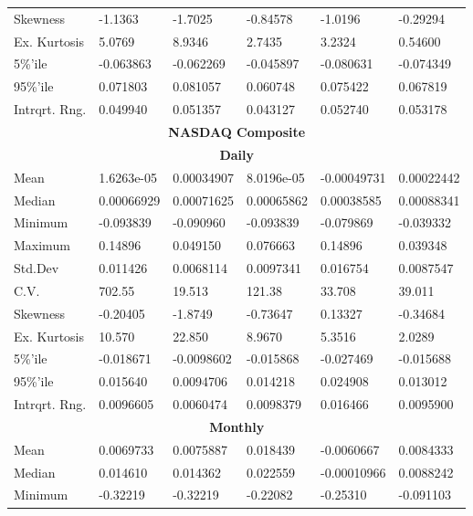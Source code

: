 \documentclass[11pt, english]{article}
\begin{document}
\begin{center}
\begin{longtable}{p{2cm}p{2cm}p{2cm}p{2cm}p{2cm}p{2cm} }
		Skewness & -1.1363 & -1.7025 & -0.84578 & -1.0196 & -0.29294\\
		Ex. Kurtosis & 5.0769 & 8.9346 & 2.7435 & 3.2324 & 0.54600\\
		5\%’ile & -0.063863 & -0.062269 & -0.045897 & -0.080631 & -0.074349\\
		95\%’ile & 0.071803 & 0.081057 & 0.060748 & 0.075422 & 0.067819\\
		Intrqrt. Rng. & 0.049940 & 0.051357 & 0.043127 & 0.052740 & 0.053178\\
		\hline
		\hline
		\multicolumn{6}{c}{\textbf{NASDAQ Composite}}\\
		\hline
		\hline
                \multicolumn{6}{c}{\textbf{Daily}}\\
                \hline
		Mean & 1.6263e-05 & 0.00034907 & 8.0196e-05 & -0.00049731 & 0.00022442\\ 
                Median & 0.00066929 & 0.00071625 & 0.00065862 & 0.00038585 & 0.00088341\\
                Minimum & -0.093839 & -0.090960 & -0.093839 & -0.079869 & -0.039332\\ 
                Maximum & 0.14896 & 0.049150 & 0.076663 & 0.14896 & 0.039348\\
                Std.Dev & 0.011426 & 0.0068114 & 0.0097341 & 0.016754 & 0.0087547\\
                C.V. & 702.55 & 19.513 & 121.38 & 33.708 & 39.011\\
                Skewness & -0.20405 & -1.8749 & -0.73647 & 0.13327 & -0.34684\\
                Ex. Kurtosis & 10.570 & 22.850 & 8.9670 & 5.3516 & 2.0289\\
                5\%’ile & -0.018671 & -0.0098602 & -0.015868 & -0.027469 & -0.015688\\
                95\%’ile & 0.015640 & 0.0094706 & 0.014218 & 0.024908 & 0.013012\\
                Intrqrt. Rng. & 0.0096605 & 0.0060474 & 0.0098379 & 0.016466 & 0.0095900\\
		\hline
                \multicolumn{6}{c}{\textbf{Monthly}}\\ 
                \hline
		Mean & 0.0069733 & 0.0075887 & 0.018439 & -0.0060667 & 0.0084333\\
                Median & 0.014610 & 0.014362 & 0.022559 & -0.00010966 & 0.0088242\\
                Minimum & -0.32219 & -0.32219 & -0.22082 & -0.25310 & -0.091103\\

\end{longtable}
\end{center}
\end{document}
